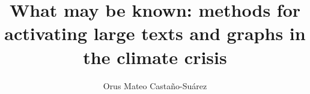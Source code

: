 \title{What may be known: methods for activating large texts and graphs in the climate crisis}
\author{Orus Mateo Castaño-Suárez}




